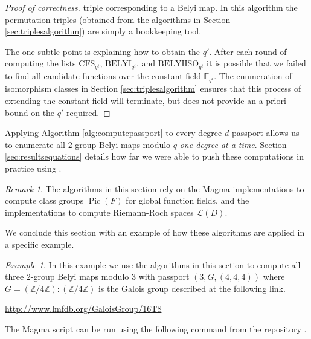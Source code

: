 \documentclass{dcthesis}
\newcommand{\ZZ}{\mathbb Z}
\newcommand{\mm}[1]{{\color{blue} \sf MM: [#1]}}
\newcommand{\FF}{\mathbb{F}}
\DeclareMathOperator{\Pic}{Pic}
\numberwithin{equation}{section}
\theoremstyle{definition}
\theoremstyle{remark}
\newtheorem{remark}[equation]{Remark}
\newtheorem{example}[equation]{Example}
\begin{document}
{{{\begin{proof}[Proof of correctness]
      triple corresponding to a Belyi map.
      In this algorithm the permutation triples
      (obtained from the algorithms in Section
      \ref{sec:triplesalgorithm})
      are simply a bookkeeping tool.
      \par
      The one subtle point is
      explaining how to obtain
      the $q'$.
      After each round of computing
      the lists
      $\mathrm{CFS}_{q^i}$,
      $\mathrm{BELYI}_{q^i}$,
      and
      $\mathrm{BELYIISO}_{q^i}$
      it is possible that
      we failed to find all candidate functions
      over the constant field
      $\FF_{q^i}$.
      The enumeration of isomorphism classes
      in Section
      \ref{sec:triplesalgorithm}
      ensures that this process of
      extending the constant field will
      terminate,
      but does not provide an
      a priori bound on the $q'$
      required.
    \end{proof}
    Applying Algorithm
    \ref{alg:computepassport}
    to every degree $d$ passport
    allows us to enumerate all
    $2$-group Belyi maps modulo $q$
    \emph{one degree at a time}.
    Section \ref{sec:resultsequations}
    details how far we were able to push
    these computations in practice
    using \cite{twogroupdessins}.
    \begin{remark}
      \label{rmk:computationalremarks}
      The algorithms in this section rely
      on the \textsf{Magma}
      implementations to compute
      class groups $\Pic(F)$
      for global function fields,
      and the implementations
      to compute Riemann-Roch spaces
      $\mathscr{L}(D)$.
    \end{remark}
    We conclude this section
    with an example of how these
    algorithms are applied in a specific
    example.
    \begin{example}
      \label{exm:equationsinmagma}
      In this example we use the algorithms
      in this section to compute
      all three
      $2$-group Belyi maps modulo $3$
      with passport $(3,G,(4,4,4))$
      where $G = (\ZZ/4\ZZ) : (\ZZ/4\ZZ)$
      is the Galois group described
      at the following link.
      \begin{center}
        \url{http://www.lmfdb.org/GaloisGroup/16T8}
      \end{center}
      The \textsf{Magma} script can be run
      using the following command
      from the repository \cite{twogroupdessins}.

\end{example}}}}
\end{document}
